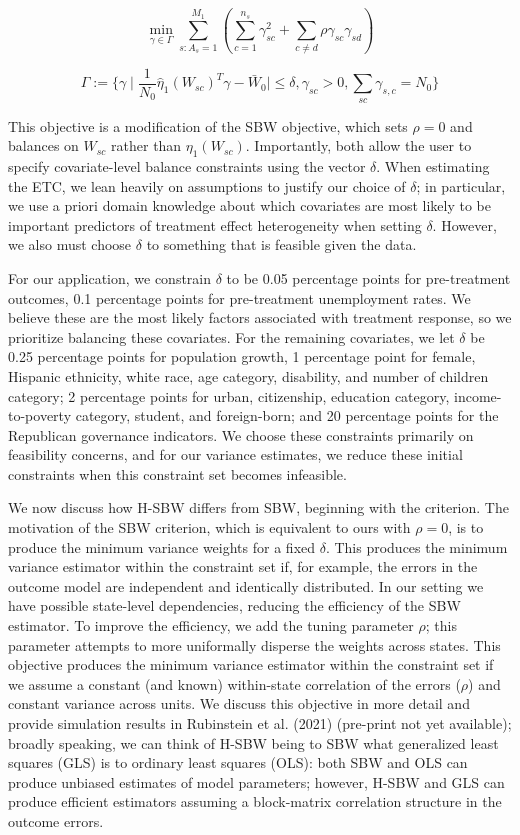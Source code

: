 \documentclass[aoas]{imsart}
\theoremstyle{plain}
\theoremstyle{remark}
\begin{document}
$$
\min_{\gamma \in \Gamma} \sum_{s: A_s = 1}^{M_1}(\sum_{c = 1}^{n_s} \gamma_{sc}^2 + \sum_{c \ne d}\rho \gamma_{sc}\gamma_{sd})
$$

$$
\Gamma := \{\gamma \mid \frac{1}{N_0}\hat{\eta}_1(W_{sc})^T\gamma - \bar{W}_0 \mid \le \delta, \gamma_{sc} > 0, \sum_{sc}\gamma_{s,c} = N_0\}
$$

This objective is a modification of the SBW objective, which sets $\rho = 0$ and balances on $W_{sc}$ rather than $\eta_1(W_{sc})$. Importantly, both allow the user to specify covariate-level balance constraints using the vector $\delta$. When estimating the ETC, we lean heavily on assumptions to justify our choice of $\delta$; in particular, we use a priori domain knowledge about which covariates are most likely to be important predictors of treatment effect heterogeneity when setting $\delta$. However, we also must choose $\delta$ to something that is feasible given the data. 

For our application, we constrain $\delta$ to be 0.05 percentage points for pre-treatment outcomes, 0.1 percentage points for pre-treatment unemployment rates. We believe these are the most likely factors associated with treatment response, so we prioritize balancing these covariates. For the remaining covariates, we let $\delta$ be 0.25 percentage points for population growth, 1 percentage point for female, Hispanic ethnicity, white race, age category, disability, and number of children category; 2 percentage points for urban, citizenship, education category, income-to-poverty category, student, and foreign-born; and 20 percentage points for the Republican governance indicators. We choose these constraints primarily on feasibility concerns, and for our variance estimates, we reduce these initial constraints when this constraint set becomes infeasible.

We now discuss how H-SBW differs from SBW, beginning with the criterion. The motivation of the SBW criterion, which is equivalent to ours with $\rho = 0$, is to produce the minimum variance weights for a fixed $\delta$. This produces the minimum variance estimator within the constraint set if, for example, the errors in the outcome model are independent and identically distributed. In our setting we have possible state-level dependencies, reducing the efficiency of the SBW estimator. To improve the efficiency, we add the tuning parameter $\rho$; this parameter attempts to more uniformally disperse the weights across states. This objective produces the minimum variance estimator within the constraint set if we assume a constant (and known) within-state correlation of the errors ($\rho$) and constant variance across units. We discuss this objective in more detail and provide simulation results in Rubinstein et al. (2021) (pre-print not yet available); broadly speaking, we can think of H-SBW being to SBW what generalized least squares (GLS) is to ordinary least squares (OLS): both SBW and OLS can produce unbiased estimates of model parameters; however, H-SBW and GLS can produce efficient estimators assuming a block-matrix correlation structure in the outcome errors. 
\end{document}

